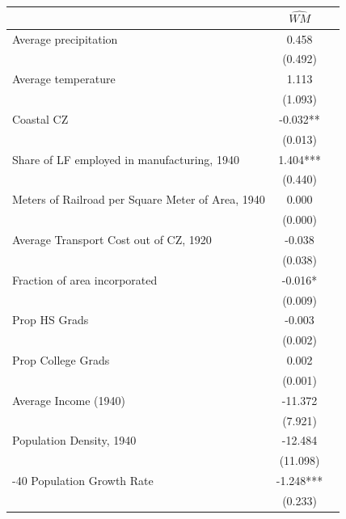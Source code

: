  \begin{tabular}{l*{2}{c}} \toprule
                &\multicolumn{1}{c}{$\widehat{WM}$}\\
\midrule
Average precipitation&    0.458   \\
                &  (0.492)   \\
\addlinespace
Average temperature&    1.113   \\
                &  (1.093)   \\
\addlinespace
Coastal CZ      &   -0.032** \\
                &  (0.013)   \\
\addlinespace
Share of LF employed in manufacturing, 1940&    1.404***\\
                &  (0.440)   \\
\addlinespace
Meters of Railroad per Square Meter of Area, 1940&    0.000   \\
                &  (0.000)   \\
\addlinespace
Average Transport Cost out of CZ, 1920&   -0.038   \\
                &  (0.038)   \\
\addlinespace
Fraction of area incorporated&   -0.016*  \\
                &  (0.009)   \\
\addlinespace
Prop HS Grads   &   -0.003   \\
                &  (0.002)   \\
\addlinespace
Prop College Grads&    0.002   \\
                &  (0.001)   \\
\addlinespace
Average Income (1940)&  -11.372   \\
                &  (7.921)   \\
\addlinespace
Population Density, 1940&  -12.484   \\
                & (11.098)   \\
\addlinespace
1930-40 Population Growth Rate&   -1.248***\\
                &  (0.233)   \\
       \bottomrule \end{tabular}
